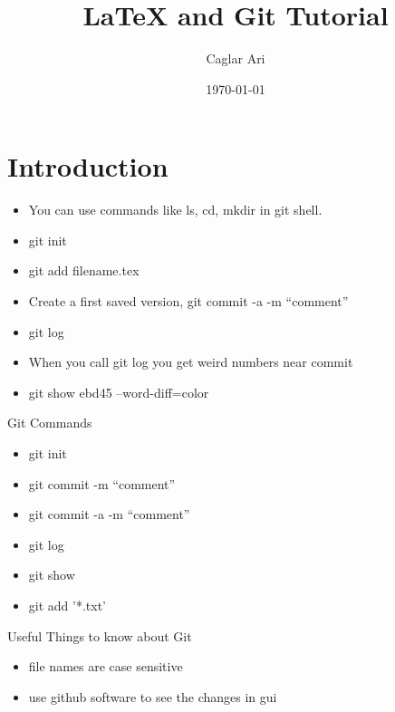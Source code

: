 \documentclass[12pt]{article}
\begin{document}
\title{\LaTeX\; and Git Tutorial}
\author{Caglar Ari}
\date{\today}
\maketitle
{}

\section{Introduction}
\begin{itemize}
\item You can use commands like ls, cd, mkdir in git shell.
\item git init
\item git add filename.tex
\item Create a first saved version, git commit -a -m "`comment"'
\item git log
\item When you call git log you get weird numbers near commit
\item git show ebd45 --word-diff=color
\end{itemize}

Git Commands
\begin{itemize}
\item git init
\item git commit -m "`comment"'
\item git commit -a -m "`comment"'
\item git log
\item git show
\item git add '*.txt'
\end{itemize}

Useful Things to know about Git
\begin{itemize}
\item file names are case sensitive
\item use github software to see the changes in gui
\end{itemize}
\end{document}
